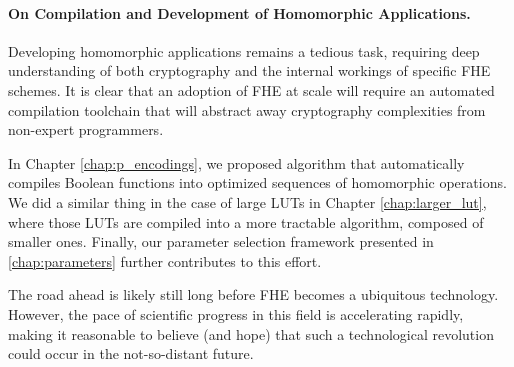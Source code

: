 \paragraph{On Compilation and Development of Homomorphic Applications.}
%

Developing homomorphic applications remains a tedious task, requiring deep understanding of both cryptography and the internal workings of specific \gls{FHE} schemes. It is clear that an adoption of \gls{FHE} at scale will require an automated compilation toolchain that will abstract away cryptography complexities from non-expert programmers.

In Chapter \ref{chap:p_encodings}, we proposed algorithm that automatically compiles Boolean functions into optimized sequences of homomorphic operations. We did a similar thing in the case of large LUTs in Chapter \ref{chap:larger_lut}, where those LUTs are compiled into a more tractable algorithm, composed of smaller ones. Finally, our parameter selection framework presented in \ref{chap:parameters} further contributes to this effort.


\bigskip

The road ahead is likely still long before \gls{FHE} becomes a ubiquitous technology. However, the pace of scientific progress in this field is accelerating rapidly, making it reasonable to believe (and hope) that such a technological revolution could occur in the not-so-distant future.




